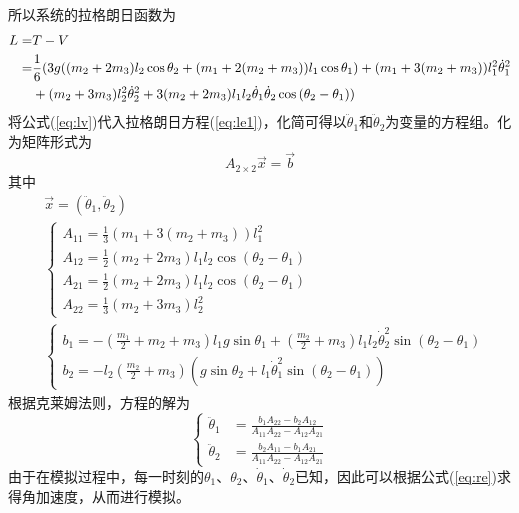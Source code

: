 \documentclass[a4paper,12pt,titlepage]{article}
\begin{document}
所以系统的拉格朗日函数为
\begin{align}
\label{eq:lv}
	L=&T-V \notag\\
	=&\frac{1}{6} ( 3 g ((m_2+2 m_3) l_2 \cos{\theta_2}+ (m_1+2 (m_2+m_3))l_1 \cos{\theta_1})+(m_1+3(m_2+m_3)) l_1^2 \dot{\theta}_1^2 \notag \\
    &+ (m_2+3 m_3) l_2^2\dot{\theta}_2^2+3(m_2+2m_3) l_1 l_2 \dot{\theta}_1 \dot{\theta}_2 \cos{(\theta_2-\theta_1)} )
\end{align}
将公式(\ref{eq:lv})代入拉格朗日方程(\ref{eq:le1})，化简可得以$\ddot{\theta}_1 $和$\ddot{\theta}_2 $为变量的方程组。化为矩阵形式为
\begin{equation}
\label{eq:me}
	A_{2\times 2}\vec{x}=\vec{b}
\end{equation}
其中
\begin{align}
	\label{eq:parx}
	&\vec{x}=\left(\ddot{\theta}_1,\ddot{\theta}_2\right)\\
	\label{eq:parA}
	&\begin{cases}
		A_{11}=\frac{1}{3}(m_1+3(m_2 + m_3))l_1^2 \\
		A_{12}=\frac{1}{2}(m_2+2m_3)l_1l_2\cos{(\theta_2-\theta_1)} \\
		A_{21}=\frac{1}{2}(m_2+2m_3)l_1l_2\cos{(\theta_2-\theta_1)} \\
		A_{22}=\frac{1}{3}(m_2+3 m_3)l_2^2 
	\end{cases}\\
	\label{eq:parb}
	&\begin{cases}
		b_1=-\left(\frac{m_1}{2}+m_2+m_3\right)l_1g\sin{\theta_1}+\left(\frac{m_2}{2}+m_3\right)l_1l_2\dot{\theta}_2^2\sin{(\theta_2-\theta_1)}\\
		b_2=-l_2 \left(\frac{m_2}{2}+ m_3\right) \left(g \sin{\theta_2}+l_1\dot{\theta}_1^2 \sin \left(\theta_2-\theta_1\right)\right)
	\end{cases}
\end{align}
根据克莱姆法则，方程的解为
\begin{equation}
\label{eq:re}
	\begin{cases}
		\ddot{\theta}_1&=\frac{b_1A_{22}-b_2A_{12}}{A_{11}A_{22}-A_{12}A_{21}}\\
		\ddot{\theta}_2&=\frac{b_2A_{11}-b_1A_{21}}{A_{11}A_{22}-A_{12}A_{21}}
	\end{cases}
\end{equation}
由于在模拟过程中，每一时刻的$\theta_1$、$\theta_2$、$\dot{\theta}_1$、$\dot{\theta}_2$已知，因此可以根据公式(\ref{eq:re})求得角加速度，从而进行模拟。
\end{document}
